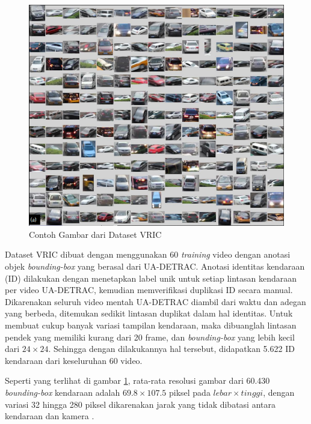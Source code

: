 \begin{figure}[h]
  \centering
  \includegraphics[scale=0.6]{gambar/Contoh boundingbox VRIC.png}
  \caption{Contoh Gambar dari Dataset VRIC}
  \label{fig:contohgambardaridatasetvric}
\end{figure}

Dataset VRIC dibuat dengan menggunakan 60 \emph{training} video dengan anotasi objek \linebreak \emph{bounding-box} yang berasal dari UA-DETRAC. Anotasi identitas kendaraan (ID) dilakukan dengan menetapkan 
label unik untuk setiap lintasan kendaraan per video UA-DETRAC, kemudian memverifikasi duplikasi ID secara manual. Dikarenakan seluruh video mentah UA-DETRAC diambil dari waktu dan adegan 
yang berbeda, ditemukan sedikit lintasan duplikat dalam hal identitas. Untuk membuat cukup banyak variasi tampilan kendaraan, maka dibuanglah lintasan pendek yang memiliki kurang dari 20 
frame, dan \emph{bounding-box} yang lebih kecil dari \begin{math}24 \times 24\end{math}. Sehingga dengan dilakukannya hal tersebut, didapatkan 5.622 ID kendaraan dari keseluruhan 60 video. 
\parencite{Kanaci2018}

Seperti yang terlihat di gambar \ref{fig:contohgambardaridatasetvric}, rata-rata resolusi gambar dari 60.430 \emph{bounding-box} kendaraan adalah \begin{math}69.8 \times 107.5\end{math} piksel pada 
\begin{math}lebar \times tinggi\end{math}, dengan variasi 32 hingga 280 piksel dikarenakan jarak yang tidak dibatasi antara kendaraan dan kamera \parencite{Kanaci2018}.

